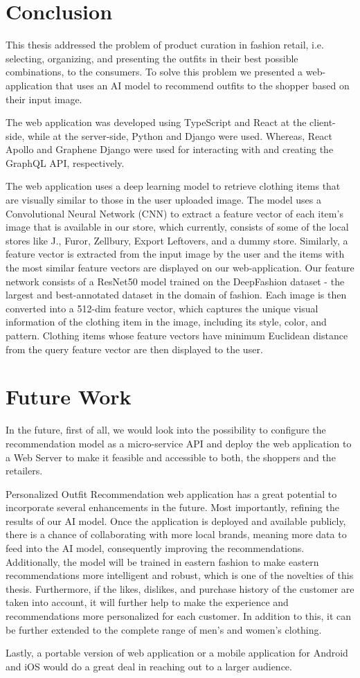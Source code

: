 \section{Conclusion}
This thesis addressed the problem of product curation in fashion retail, i.e. selecting, organizing, and presenting the outfits in their best possible combinations, to the consumers. To solve this problem we presented a web-application that uses an AI model to recommend outfits to the shopper based on their input image. 

The web application was developed using TypeScript and React at the client-side, while at the server-side, Python and Django were used.  Whereas, React Apollo and Graphene Django were used for interacting with and creating the GraphQL API, respectively. 

The web application uses a  deep learning model to retrieve clothing items that are visually similar to those in the user uploaded image. The model uses a Convolutional Neural Network (CNN) to extract a feature vector of each item's image that is available in our store, which currently, consists of some of the local stores like J., Furor, Zellbury, Export Leftovers, and a dummy store. Similarly, a feature vector is extracted from the input image by the user and the items with the most similar feature vectors are displayed on our web-application. Our feature network consists of a ResNet50 model trained on the DeepFashion dataset - the largest and best-annotated dataset in the domain of fashion. Each image is then converted into a 512-dim feature vector, which captures the unique visual information of the clothing item in the image, including its style, color, and pattern. Clothing items whose feature vectors have minimum Euclidean distance from the query feature vector are then displayed to the user.
\section{Future Work}

In the future, first of all, we would look into the possibility to configure the recommendation model as a micro-service API and deploy the web application to a Web Server to make it feasible and accessible to both, the shoppers and the retailers.

Personalized Outfit Recommendation web application has a great potential to incorporate several enhancements in the future. Most importantly, refining the results of our AI model. Once the application is deployed and available publicly, there is a chance of collaborating with more local brands, meaning more data to feed into the AI model, consequently improving the recommendations. Additionally, the model will be trained in eastern fashion to make eastern recommendations more intelligent and robust, which is one of the novelties of this thesis. Furthermore, if the likes, dislikes, and purchase history of the customer are taken into account, it will further help to make the experience and recommendations more personalized for each customer. In addition to this, it can be further extended to the complete range of men's and women's clothing.

Lastly, a portable version of web application or a mobile application for Android and iOS would do a great deal in reaching out to a larger audience.

